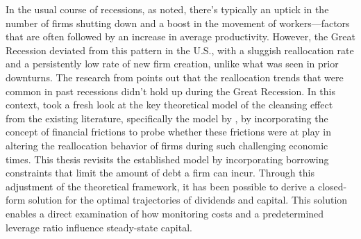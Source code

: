 \documentclass[12pt]{report}
\begin{document}
In the usual course of recessions, as \cite{DavHalt92} noted, there's typically an uptick in the number of firms
shutting down and a boost in the movement of workers—factors that are often followed by an increase in average
productivity. However, the Great Recession deviated from this pattern in the U.S., with a sluggish reallocation rate and
a persistently low rate of new firm creation, unlike what was seen in prior downturns. The research from \cite{FosHal16}
points out that the reallocation trends that were common in past recessions didn't hold up during the Great Recession.
In this context, \cite{OsePap17} took a fresh look at the key theoretical model of the cleansing effect from the
existing literature, specifically the model by \cite{CabHarm94}, by incorporating the concept of financial frictions to
probe whether these frictions were at play in altering the reallocation behavior of firms during such challenging
economic times. 
% 
This thesis revisits the established model by incorporating borrowing constraints that limit the amount of debt a firm
can incur. Through this adjustment of the theoretical framework, it has been possible to derive a closed-form solution
for the optimal trajectories of dividends and capital. This solution enables a direct examination of how monitoring
costs and a predetermined leverage ratio influence steady-state capital. 
\end{document}
